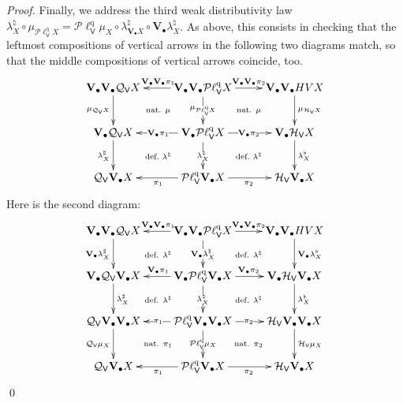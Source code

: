 \documentclass[preprint,12pt]{elsarticle}
\newcommand\Smyth{{\mathcal Q}}
\newcommand\Hoare{{\mathcal H}}
\newcommand\Vt{\mathsf{V}}
\newcommand\HV{\Hoare_\Vt}
\newcommand\SV{\Smyth_{\Vt}}
\newcommand\quasi{\mathrm{q}} %
\newcommand\QL{\Plotkin^\quasi}
\newcommand\QLV{\QL_\Vt}
\newcommand\Plotkin{\mathcal P\ell} %
\newcommand\Val{{\mathbf V}}
\begin{document}
\begin{proof}
  Finally, we address the third weak distributivity law
  ${\lambda^\natural_X} \circ \mu_{\QLV X} = \QLV {\mu_X} \circ
  \lambda^\natural_{\Val_\bullet X} \circ \Val_\bullet
  {\lambda^\natural_X}$.  As above, this consists in checking that the
  leftmost compositions of vertical arrows in the following two
  diagrams match, so that the middle compositions of vertical arrows
  coincide, too.
  \[
    \xymatrix{
      \Val_\bullet {\Val_\bullet {\SV X}}
      \ar[d]_{\mu_{\SV X}}
      &
      \Val_\bullet {\Val_\bullet {\QLV X}}
      \ar[l]_{\Val_\bullet {\Val_\bullet {\pi_1}}}
      \ar@{}[ld]|{\text{nat. $\mu$}}
      \ar@{}[rd]|{\text{nat. $\mu$}}
      \ar[d]|{\mu_{\QLV X}}
      \ar[r]^{\Val_\bullet {\Val_\bullet {\pi_2}}}
      &
      \Val_\bullet {\Val_\bullet {HV X}}
      \ar[d]^{\mu_{\HV X}}
      \\
      \Val_\bullet {\SV X}
      \ar[d]_{\lambda^\sharp_X}
      &
      \Val_\bullet {\QLV X}
      \ar[d]|{\lambda^\natural_X}
      \ar[l]|{\Val_\bullet {\pi_1}}
      \ar@{}[ld]|{\text{def.\ $\lambda^\natural$}}
      \ar@{}[rd]|{\text{def.\ $\lambda^\natural$}}
      \ar[r]|{\Val_\bullet {\pi_2}}
      &
      \Val_\bullet {\HV X}
      \ar[d]^{\lambda^\flat_X}
      \\
      \SV {\Val_\bullet X}
      & \QLV {\Val_\bullet X}
      \ar[l]^{\pi_1}
      \ar[r]_{\pi_2}
      & \HV {\Val_\bullet X}
    }
  \]
  Here is the second diagram:
  \[
    \xymatrix{
      \Val_\bullet {\Val_\bullet {\SV X}}
      \ar[d]_{\Val_\bullet {\lambda^\sharp_X}}
      &
      \Val_\bullet {\Val_\bullet {\QLV X}}
      \ar[l]_{\Val_\bullet {\Val_\bullet {\pi_1}}}
      \ar@{}[ld]|{\text{def. $\lambda^\natural$}}
      \ar@{}[rd]|{\text{def. $\lambda^\natural$}}
      \ar[d]|{\Val_\bullet {\lambda^\natural_X}}
      \ar[r]^{\Val_\bullet {\Val_\bullet {\pi_2}}}
      &
      \Val_\bullet {\Val_\bullet {HV X}}
      \ar[d]^{\Val_\bullet {\lambda^\flat_X}}
      \\
      \Val_\bullet {\SV {\Val_\bullet X}}
      \ar[d]^{\lambda^\sharp_X}
      &
      \Val_\bullet {\QLV {\Val_\bullet X}}
      \ar[l]_{\Val_\bullet {\pi_1}}
      \ar@{}[ld]|{\text{def. $\lambda^\natural$}}
      \ar@{}[rd]|{\text{def. $\lambda^\natural$}}
      \ar[d]|{\lambda^\natural_X}
      \ar[r]^{\Val_\bullet {\pi_2}}
      &
      \Val_\bullet {\HV {\Val_\bullet X}}
      \ar[d]^{\lambda^\flat_X}
      \\
      \SV {\Val_\bullet {\Val_\bullet X}}
      \ar[d]_{\SV {\mu_X}}
      &
      \QLV {\Val_\bullet {\Val_\bullet X}}
      \ar[l]|{\pi_1}
      \ar@{}[ld]|{\text{nat. $\pi_1$}}
      \ar@{}[rd]|{\text{nat. $\pi_2$}}
      \ar[d]|{\QLV {\mu_X}}
      \ar[r]|{\pi_2}
      &
      \HV {\Val_\bullet {\Val_\bullet X}}
      \ar[d]^{\HV {\mu_X}}
      \\
      \SV {\Val_\bullet X}
      &
      \QLV {\Val_\bullet X}
      \ar[l]^{\pi_1}
      \ar[r]_{\pi_2}
      &
      \HV {\Val_\bullet X}
    }
  \]
  \qed
\end{proof}
\end{document}
